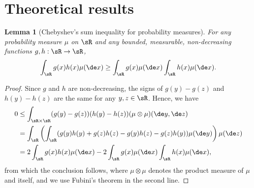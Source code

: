 \documentclass{article}
\newtheorem{lemma}{Lemma}
\begin{document}
{\footnotesize


}



\appendix

\section{Theoretical results}


\begin{lemma}[Chebyshev's sum inequality for probability measures] \label{lem:chebyshev}
For any probability measure $\mu$ on $\sR$ and any bounded, measurable, non-decreasing functions $g, h: \sR \to \sR$,
\begin{align}
    \int_\sR g(x)h(x) \mu(\de x) \geq \int_\sR g(x) \mu(\de x) \int_\sR h(x) \mu(\de x).
\end{align}
\end{lemma}
\begin{proof}
Since $g$ and $h$ are non-decreasing, the signs of $g(y) - g(z)$ and $h(y) - h(z)$ are the same for any $y, z \in \sR$.
Hence, we have
\begin{align}
    0 &\leq \int_{\sR \times \sR} (g(y) - g(z)) (h(y) - h(z)) (\mu \otimes \mu) (\de y, \de z) \\
    &= \int_\sR \left( \int_\sR (g(y)h(y) + g(z)h(z) - g(y)h(z) - g(z)h(y)) \mu(\de y) \right) \mu(\de z) \\
    &= 2 \int_\sR g(x)h(x) \mu(\de x) - 2 \int_\sR g(x) \mu(\de x) \int_\sR h(x) \mu(\de x),
\end{align}
from which the conclusion follows,
where $\mu \otimes \mu$ denotes the product measure of $\mu$ and itself,
and we use Fubini's theorem in the second line.
\end{proof}
\end{document}

